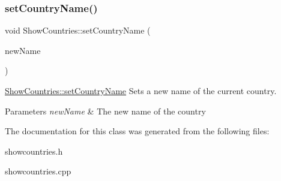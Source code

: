\subsubsection{\texorpdfstring{set\+Country\+Name()}{setCountryName()}}
{\footnotesize\ttfamily void Show\+Countries\+::set\+Country\+Name (\begin{DoxyParamCaption}\item[{Q\+String}]{new\+Name }\end{DoxyParamCaption})}



\hyperlink{class_show_countries_aefa9daeff484f4028ea5a280b280dd36}{Show\+Countries\+::set\+Country\+Name} Sets a new name of the current country. 


\begin{DoxyParams}{Parameters}
{\em new\+Name} & The new name of the country \\
\hline
\end{DoxyParams}


The documentation for this class was generated from the following files\+:\begin{DoxyCompactItemize}
\item 
showcountries.\+h\item 
showcountries.\+cpp\end{DoxyCompactItemize}
